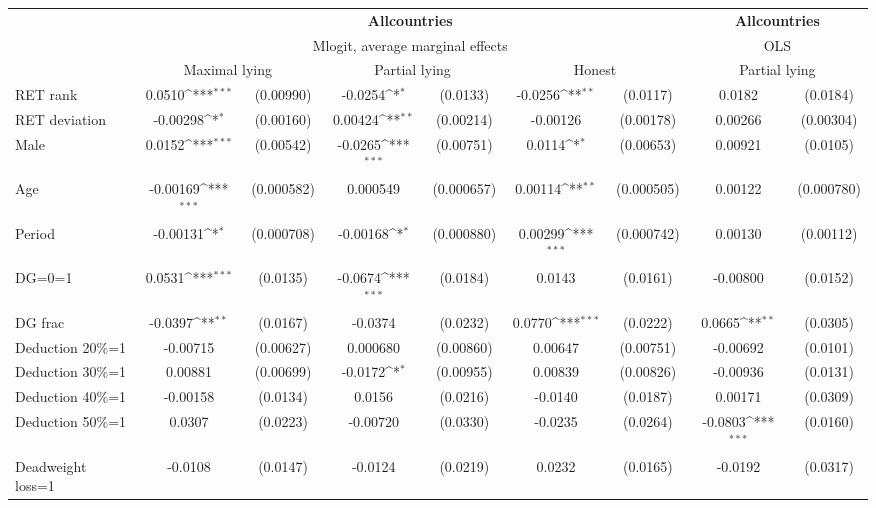 \def\sym#1{\ifmmode^{#1}\else\(^{#1}\)\fi}
\begin{tabular}{l|cccccc|cc}
\hline\hline
&\multicolumn{6}{c|}{\bf All\space{}countries}&\multicolumn{2}{c}{\bf All\space{}countries}\\ &\multicolumn{6}{c|}{Mlogit, average marginal effects }&\multicolumn{2}{c}{OLS}\\
                &\multicolumn{2}{c}{Maximal lying}&\multicolumn{2}{c}{Partial lying}&\multicolumn{2}{c}{Honest}  &\multicolumn{2}{c}{Partial lying}\\
\hline
RET rank        &   0.0510\sym{***}&(0.00990)&  -0.0254\sym{*}  & (0.0133)&  -0.0256\sym{**} & (0.0117)&   0.0182         & (0.0184)\\
RET deviation   & -0.00298\sym{*}  &(0.00160)&  0.00424\sym{**} &(0.00214)& -0.00126         &(0.00178)&  0.00266         &(0.00304)\\
Male            &   0.0152\sym{***}&(0.00542)&  -0.0265\sym{***}&(0.00751)&   0.0114\sym{*}  &(0.00653)&  0.00921         & (0.0105)\\
Age             & -0.00169\sym{***}&(0.000582)& 0.000549         &(0.000657)&  0.00114\sym{**} &(0.000505)&  0.00122         &(0.000780)\\
Period          & -0.00131\sym{*}  &(0.000708)& -0.00168\sym{*}  &(0.000880)&  0.00299\sym{***}&(0.000742)&  0.00130         &(0.00112)\\
DG=0=1          &   0.0531\sym{***}& (0.0135)&  -0.0674\sym{***}& (0.0184)&   0.0143         & (0.0161)& -0.00800         & (0.0152)\\
DG frac         &  -0.0397\sym{**} & (0.0167)&  -0.0374         & (0.0232)&   0.0770\sym{***}& (0.0222)&   0.0665\sym{**} & (0.0305)\\
Deduction 20\%=1& -0.00715         &(0.00627)& 0.000680         &(0.00860)&  0.00647         &(0.00751)& -0.00692         & (0.0101)\\
Deduction 30\%=1&  0.00881         &(0.00699)&  -0.0172\sym{*}  &(0.00955)&  0.00839         &(0.00826)& -0.00936         & (0.0131)\\
Deduction 40\%=1& -0.00158         & (0.0134)&   0.0156         & (0.0216)&  -0.0140         & (0.0187)&  0.00171         & (0.0309)\\
Deduction 50\%=1&   0.0307         & (0.0223)& -0.00720         & (0.0330)&  -0.0235         & (0.0264)&  -0.0803\sym{***}& (0.0160)\\
Deadweight loss=1&  -0.0108         & (0.0147)&  -0.0124         & (0.0219)&   0.0232         & (0.0165)&  -0.0192         & (0.0317)\\

\end{tabular}

